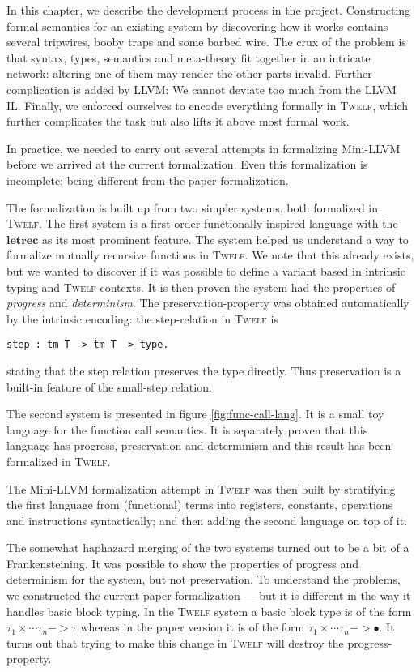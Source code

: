 \documentclass[a4paper, oneside, 10pt, final]{memoir}
\newcommand{\twelf}{\textsc{Twelf}}
\begin{document}
In this chapter, we describe the development process in the
project. Constructing formal semantics for an existing system by
discovering how it works contains several tripwires, booby traps and
some barbed wire. The crux of the problem is that syntax, types,
semantics and meta-theory fit together in an intricate network:
altering one of them may render the other parts invalid. Further
complication is added by LLVM: We cannot deviate too much from the
LLVM IL. Finally, we enforced ourselves to encode everything formally
in \twelf{}, which further complicates the task but also lifts it
above most formal work.

In practice, we needed to carry out several attempts in formalizing
Mini-LLVM before we arrived at the current formalization. Even this
formalization is incomplete; being different from the paper formalization.

The formalization is built up from two simpler systems, both
formalized in \twelf{}. The first system is a first-order
functionally inspired language with the $\mathbf{letrec}$ as its most
prominent feature. The system helped us understand a way to formalize
mutually recursive functions in \twelf{}. We note that this already
exists\cite{twelfwiki:2007}, but we wanted to discover if it was
possible to define a variant based in intrinsic typing and
\twelf{}-contexts. It is then proven the system had the properties of
\emph{progress} and \emph{determinism}. The preservation-property was
obtained automatically by the intrinsic encoding: the step-relation in
\twelf{} is
\begin{verbatim}
step : tm T -> tm T -> type.
\end{verbatim}
stating that the step relation preserves the type directly. Thus
preservation is a built-in feature of the small-step relation.

The second system is presented in figure \ref{fig:func-call-lang}. It
is a small toy language for the function call semantics. It is
separately proven that this language has progress, preservation and
determinism and this result has been formalized in \twelf{}.

The Mini-LLVM formalization attempt in \twelf{} was then built by
stratifying the first language from (functional) terms into registers,
constants, operations and instructions syntactically; and then adding
the second language on top of it.

The somewhat haphazard merging of the two systems turned out to be a
bit of a Frankensteining. It was possible to show the properties of
progress and determinism for the system, but not preservation. To
understand the problems, we constructed the current
paper-formalization --- but it is different in the way it handles
basic block typing. In the \twelf{} system a basic block type is of
the form $\tau_1 \times \dotsb \tau_n -> \tau$ whereas in the paper
version it is of the form $\tau_1 \times \dotsb \tau_n -> \bullet$. It
turns out that trying to make this change in \twelf{} will destroy the
progress-property.
\end{document}
